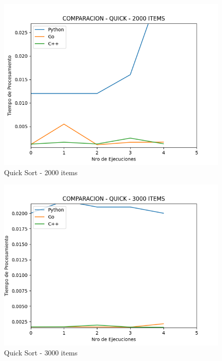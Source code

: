 \documentclass[12pt]{article} %
\begin{document}
    \begin{figure}[H]
    \centering
    \includegraphics[width=\textwidth]{quick_2000}
    \caption{Quick Sort - 2000 items}
    \end{figure}
    
    \vspace{5mm}
    
    \begin{figure}[H]
    \centering
    \includegraphics[width=\textwidth]{quick_3000}
    \caption{Quick Sort - 3000 items}
    \end{figure}
    
    \vspace{5mm}
    
\end{document}
